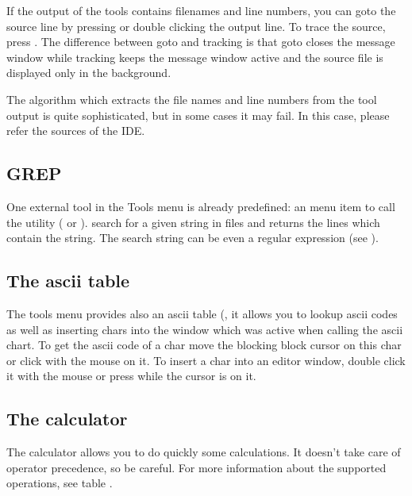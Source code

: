 If the output of the tools contains filenames and line numbers,
you can goto the source line by pressing  or
double clicking the output line. To trace the source, press
. The difference between goto and tracking is that
goto closes the message window while tracking keeps the message
window active and the source file is displayed only in the background.

The algorithm which extracts the file names and line numbers from
the tool output is quite sophisticated, but in some cases it may
fail. In this case, please refer the sources of the IDE.

\subsection{GREP}
\label{se:grep}
One external tool in the Tools menu is already predefined: an
menu item to call the  utility ( or
).  search for a given string in files and
returns the lines which contain the string. The search string can
be even a regular expression (see ).

\subsection{The ascii table}
\label{se:asciitable}
The tools menu provides also an ascii table (,
it allows you to lookup ascii codes as well as
inserting chars into the window which was active when calling the
ascii chart. To get the ascii code of a char move the blocking block
cursor on this char or click with the mouse on it. To insert a
char into an editor window, double click it with the mouse
or press  while the cursor is on it.

\subsection{The calculator}
\label{se:calculator}
The calculator allows you to do quickly some calculations. It doesn't
take care of operator precedence, so be careful. For more information
about the supported operations, see table .

